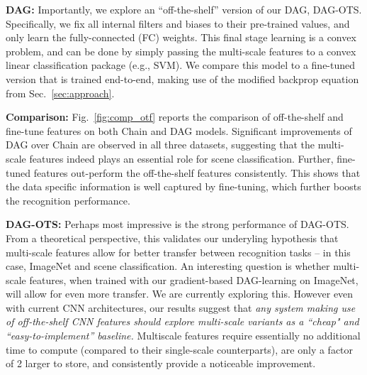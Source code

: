\documentclass[10pt,twocolumn,letterpaper]{article}
\begin{document}
{\bf DAG:} Importantly, we explore an ``off-the-shelf'' version of our DAG, DAG-OTS.  Specifically, we fix all internal filters and biases to their pre-trained values, and only learn the fully-connected (FC) weights. This final stage learning is a convex problem, and can be done by simply passing the multi-scale features to a convex linear classification package (e.g., SVM). We compare this model to a fine-tuned version that is trained end-to-end, making use of the modified backprop equation from Sec.~\ref{sec:approach}. %

{\bf Comparison:} Fig.~\ref{fig:comp_otf} reports the comparison of off-the-shelf and fine-tune features on both Chain and DAG models. Significant improvements of DAG over Chain are observed in all three datasets, suggesting that the multi-scale features indeed plays an essential role for scene classification. Further, fine-tuned features out-perform the off-the-shelf features consistently. This shows that the data specific information is well captured by fine-tuning, which further boosts the recognition performance. 

{\bf DAG-OTS:} Perhaps most impressive is the strong performance of DAG-OTS. From a theoretical perspective, this validates our underyling hypothesis that multi-scale features allow for better transfer between recognition tasks -- in this case, ImageNet and scene classification. An interesting question is whether multi-scale features, when trained with our gradient-based DAG-learning on ImageNet, will allow for even more transfer. We are currently exploring this. However even with current CNN architectures, our results suggest that {\em any system making use of off-the-shelf CNN features should explore multi-scale variants as a ``cheap" and ``easy-to-implement'' baseline.}  Multiscale features require essentially no additional time to compute (compared to their single-scale counterparts),  are only a factor of 2 larger to store, and consistently provide a noticeable improvement.



\end{document}
